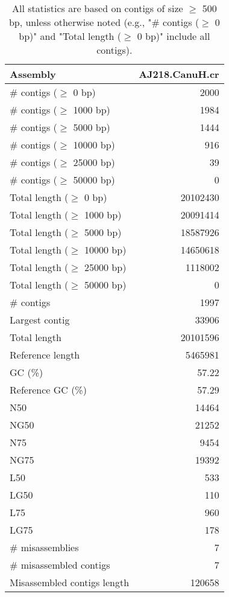 \documentclass[12pt,a4paper]{article}
\begin{document}
\begin{table}[ht]
\begin{center}
\caption{All statistics are based on contigs of size $\geq$ 500 bp, unless otherwise noted (e.g., "\# contigs ($\geq$ 0 bp)" and "Total length ($\geq$ 0 bp)" include all contigs).}
\begin{tabular}{|l*{1}{|r}|}
\hline
Assembly & AJ218.CanuH.cr \\ \hline
\# contigs ($\geq$ 0 bp) & 2000 \\ \hline
\# contigs ($\geq$ 1000 bp) & 1984 \\ \hline
\# contigs ($\geq$ 5000 bp) & 1444 \\ \hline
\# contigs ($\geq$ 10000 bp) & 916 \\ \hline
\# contigs ($\geq$ 25000 bp) & 39 \\ \hline
\# contigs ($\geq$ 50000 bp) & 0 \\ \hline
Total length ($\geq$ 0 bp) & 20102430 \\ \hline
Total length ($\geq$ 1000 bp) & 20091414 \\ \hline
Total length ($\geq$ 5000 bp) & 18587926 \\ \hline
Total length ($\geq$ 10000 bp) & 14650618 \\ \hline
Total length ($\geq$ 25000 bp) & 1118002 \\ \hline
Total length ($\geq$ 50000 bp) & 0 \\ \hline
\# contigs & 1997 \\ \hline
Largest contig & 33906 \\ \hline
Total length & 20101596 \\ \hline
Reference length & 5465981 \\ \hline
GC (\%) & 57.22 \\ \hline
Reference GC (\%) & 57.29 \\ \hline
N50 & 14464 \\ \hline
NG50 & 21252 \\ \hline
N75 & 9454 \\ \hline
NG75 & 19392 \\ \hline
L50 & 533 \\ \hline
LG50 & 110 \\ \hline
L75 & 960 \\ \hline
LG75 & 178 \\ \hline
\# misassemblies & 7 \\ \hline
\# misassembled contigs & 7 \\ \hline
Misassembled contigs length & 120658 \\ \hline

\end{tabular}
\end{center}
\end{table}
\end{document}
